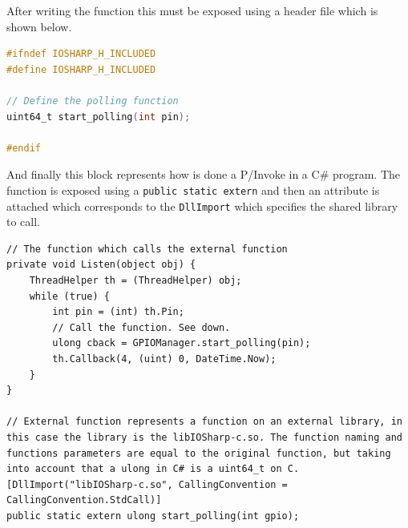 After writing the function this must be exposed using a header file which is shown below.
\begin{lstlisting}[language=C, caption={IOSharp.h - Header file for the library}]
#ifndef IOSHARP_H_INCLUDED
#define IOSHARP_H_INCLUDED

// Define the polling function
uint64_t start_polling(int pin);

#endif
\end{lstlisting}
And finally this block represents how is done a P/Invoke in a C\# program. The function is exposed using a \verb!public static extern! and then an attribute is attached which corresponds to the \verb!DllImport! which specifies the shared library to call.
\begin{lstlisting}[language=CSharp, caption={GPIOManager.cs - P/Invoke section}]
// The function which calls the external function
private void Listen(object obj) {
    ThreadHelper th = (ThreadHelper) obj;
    while (true) {
        int pin = (int) th.Pin;
        // Call the function. See down.
        ulong cback = GPIOManager.start_polling(pin);
        th.Callback(4, (uint) 0, DateTime.Now);
    }
}

// External function represents a function on an external library, in this case the library is the libIOSharp-c.so. The function naming and functions parameters are equal to the original function, but taking into account that a ulong in C# is a uint64_t on C.
[DllImport("libIOSharp-c.so", CallingConvention = CallingConvention.StdCall)]
public static extern ulong start_polling(int gpio);
\end{lstlisting}

